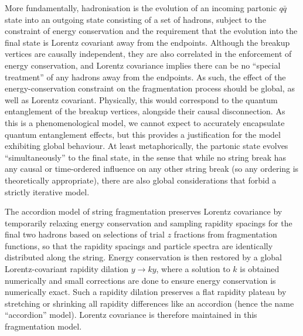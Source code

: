 \documentclass[12pt,a4paper]{report}
\begin{document}
More fundamentally, hadronisation is the evolution of an incoming partonic $q\bar{q}$ state into an outgoing state consisting of a set of hadrons, subject to the constraint of energy conservation and the requirement that the evolution into the final state is Lorentz covariant away from the endpoints. Although the breakup vertices are causally independent, they are also correlated in the enforcement of energy conservation, and Lorentz covariance implies there can be no ``special treatment'' of any hadrons away from the endpoints. As such, the effect of the energy-conservation constraint on the fragmentation process should be global, as well as Lorentz covariant. Physically, this would correspond to the quantum entanglement of the breakup vertices, alongside their causal disconnection. As this is a phenomenological model, we cannot expect to accurately encapsulate quantum entanglement effects, but this provides a justification for the model exhibiting global behaviour. At least metaphorically, the partonic state evolves ``simultaneously'' to the final state, in the sense that while no string break has any causal or time-ordered influence on any other string break (so any ordering is theoretically appropriate), there are also global considerations that forbid a strictly iterative model.

The accordion model of string fragmentation preserves Lorentz covariance by temporarily relaxing energy conservation and sampling rapidity spacings for the final two hadrons based on selections of trial $z$ fractions from fragmentation functions, so that the rapidity spacings and particle spectra are identically distributed along the string. Energy conservation is then restored by a global Lorentz-covariant rapidity dilation $y \rightarrow ky$, where a solution to $k$ is obtained numerically and small corrections are done to ensure energy conservation is numerically exact. Such a rapidity dilation preserves a flat rapidity plateau by stretching or shrinking all rapidity differences like an accordion (hence the name ``accordion'' model). Lorentz covariance is therefore maintained in this fragmentation model.
\end{document}
